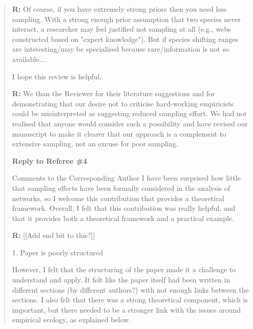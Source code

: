 \documentclass[12pt]{letter}
\newenvironment{refquote}{\bigskip \begin{it}}{\end{it}\smallskip}
\begin{document}
\begin{quotation}
		\textbf{R:} Of course, if you have extremely strong priors then you need less sampling. With a strong enough prior assumption that two species never interact, a researcher may feel justified not sampling at all (e.g., webs constructed based on "expert knowledge"). But if species shifting ranges are interesting/may be specialised because rare/information is not so available....

		\begin{refquote}
		I hope this review is helpful.  
		\end{refquote}

		\textbf{R:} We than the Reviewer for their literature suggestions and for demonstrating that our desire not to criticise hard-working empiricists could be misinterpreted as suggesting reduced sampling effort. We had not realised that anyone would consider such a possibility and have revised our manuscript to make it clearer that our approach is a complement to extensive sampling, not an excuse for poor sampling. 


\newpage

{\Large \bf Reply to Referee \#4}

	\begin{refquote}
	Comments to the Corresponding Author
	I have been surprised how little that sampling effects have been formally considered in the analysis of networks, so I welcome this contribution that provides a theoretical framework. Overall, I felt that this contribution was really helpful, and that it provides both a theoretical framework and a practical example.
	\end{refquote}

	\textbf{R:} [[Add end bit to this?]]

	1. Paper is poorly structured

	\begin{refquote}
	However, I felt that the structuring of the paper made it a challenge to understand and apply. It felt like the paper itself had been written in different sections (by different authors?) with not enough links between the sections. I also felt that there was a strong theoretical component, which is important, but there needed to be a stronger link with the issues around empirical ecology, as explained below.
	\end{refquote}


\end{quotation}
\end{document}
